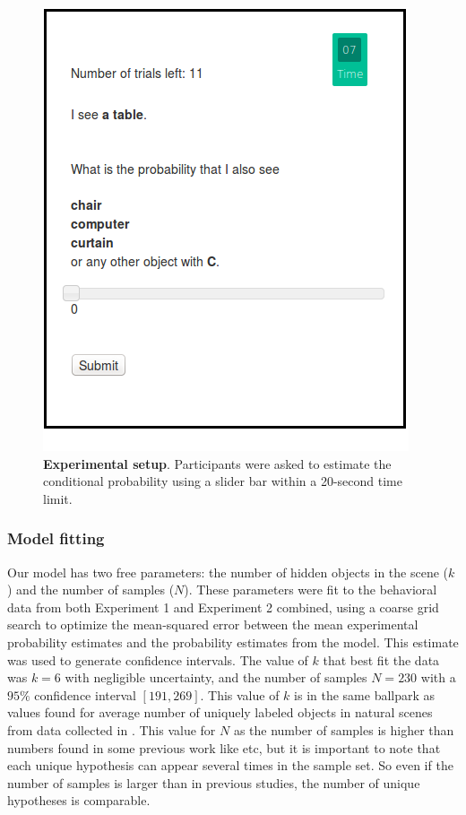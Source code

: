 \begin{figure}[ht!]
\centering
\includegraphics[scale=0.9]{figures/screenshot.png}
\caption{\textbf{Experimental setup}. Participants were asked to estimate the conditional probability using a slider bar within a 20-second time limit.}
\label{fig:screenshot}
\end{figure}

\subsubsection{Model fitting}
Our model has two free parameters: the number of hidden objects in the scene ($k$) and the number of samples ($N$). These parameters were fit to the behavioral data from both Experiment 1 and Experiment 2 combined, using a coarse grid search to optimize the mean-squared error between the mean experimental probability estimates and the probability estimates from the model.
 This estimate was used to generate confidence intervals.
The value of $k$ that best fit the data was $k=6$ with negligible uncertainty, and the number of samples $N = 230$ with a $95\%$ confidence interval $[191, 269]$. 
This value of $k$ is in the same ballpark as values found for average number of uniquely labeled objects in natural scenes from data collected in \cite{greene13}. This value for $N$ as the number of samples is higher than numbers found in some previous work like \cite{Vul2014} etc, but it is important to note that each unique hypothesis can appear several times in the sample set. So even if the number of samples is larger than in previous studies, the number of unique hypotheses is comparable.

